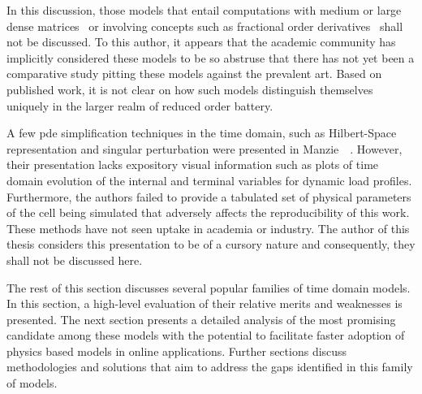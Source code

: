 In this discussion,  those models that entail computations with  medium or large
dense  matrices~\cite{Li2016,Xu2016,Corno2015}  or  involving concepts  such  as
fractional  order  derivatives~\cite{Sabatier2014,Sabatier2015, Li2017,  Mu2017,
Wang2017} shall not  be discussed. To this author, it  appears that the academic
community has  implicitly considered these models  to be so abstruse  that there
has not yet been a comparative  study pitting these models against the prevalent
art. Based  on published work,  it is not clear  on how such  models distinguish
themselves uniquely in the larger realm of reduced order battery.


A  few  \gls{pde}  simplification  techniques   in  the  time  domain,  such  as
Hilbert-Space  representation  and  singular   perturbation  were  presented  in
Manzie~\eta{}~\cite{Manzie2015}.  However, their  presentation lacks  expository
visual information  such as plots of  time domain evolution of the  internal and
terminal variables for dynamic load profiles. Furthermore, the authors failed to
provide a tabulated set of physical  parameters of the cell being simulated that
adversely affects the reproducibility of this  work. These methods have not seen
uptake  in academia  or  industry.  The author  of  this  thesis considers  this
presentation  to be  of a  cursory nature  and consequently,  they shall  not be
discussed here.


The  rest of  this section  discusses  several popular  families of  time domain
models. In  this section, a high-level  evaluation of their relative  merits and
weaknesses is  presented. The next section  presents a detailed analysis  of the
most promising  candidate among  these models with  the potential  to facilitate
faster adoption of physics based models in online applications. Further sections
discuss methodologies and  solutions that aim to address the  gaps identified in
this family of models. 


